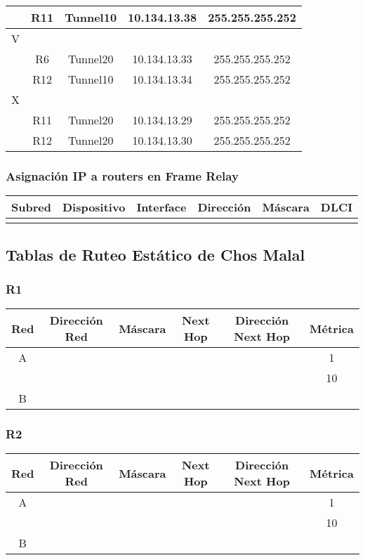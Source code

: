 \documentclass[12pt, a4paper, spanish]{article}
\begin{document}
\begin{center}
\begin{tabular}{|c|c|c|c|c|}
	\hline
	 & R11 		& Tunnel10 & 10.134.13.38 & 255.255.255.252 \\
	\hline
	\hline
	V & & & & \\
	\hline
	 & R6 		& Tunnel20 & 10.134.13.33 & 255.255.255.252 \\
	\hline
	 & R12 		& Tunnel10 & 10.134.13.34 & 255.255.255.252 \\
	\hline
	\hline
	X & & & & \\
	\hline
	 & R11 		& Tunnel20 & 10.134.13.29 & 255.255.255.252 \\
	\hline
	 & R12 		& Tunnel20 & 10.134.13.30 & 255.255.255.252 \\
	\hline
\end{tabular}
\end{center}

\subsubsection{Asignación IP a routers en Frame Relay}
\begin{center}
\begin{tabular}{|c|c|c|c|c|c|}
	\hline
	Subred & Dispositivo & Interface & Dirección & Máscara & DLCI \\
	\hline	
	\hline
	 &  &  &  &  &  \\
	\hline
\end{tabular}
\end{center}


\subsection{Tablas de Ruteo Estático de Chos Malal}
\subsubsection{R1}
\begin{center}
\begin{tabular}{|c|c|c|c|c|c|}
	\hline
	Red & Dirección Red & Máscara & Next Hop & Dirección Next Hop & Métrica \\
	\hline
	\hline
	A &  &  &  &  & 1\\ %
 	  &  &  &  &  & 10 \\ %
	\hline	
	B & & & & &\\
	\hline
\end{tabular}
\end{center}

\subsubsection{R2}
\begin{center}
\begin{tabular}{|c|c|c|c|c|c|}
	\hline
	Red & Dirección Red & Máscara & Next Hop & Dirección Next Hop & Métrica \\
	\hline
	\hline
	A &  &  &  &  & 1\\
 	  &  &  &  &  & 10 \\
	\hline	
	B & & & & &\\
	\hline
\end{tabular}
\end{center}
\end{document}
